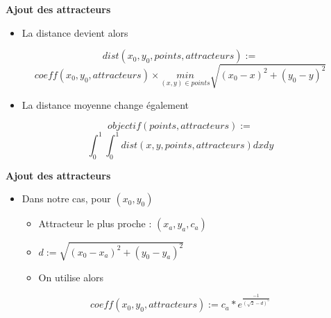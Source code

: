 \documentclass[10pt]{beamer}
\begin{document}
\begin{frame}{\textbf{Ajout des attracteurs}}

    \begin{itemize}
        \item La distance devient alors
    \end{itemize}
    $$dist(x_0, y_0, points, attracteurs) := $$
    $$coeff(x_0, y_0, attracteurs)\times\underset{(x, y)\in{}points}{min} \sqrt{(x_0-x)^2 + (y_0-y)^2}$$
    $$$$

    \begin{itemize}
        \item La distance moyenne change également
    \end{itemize}
    $$objectif(points, attracteurs) := $$
    $$\int_{0}^{1}\int_{0}^{1} dist(x, y, points, attracteurs) dxdy$$

\end{frame}


\begin{frame}{\textbf{Ajout des attracteurs}}
    
    \begin{itemize}
        \item Dans notre cas, pour $(x_0, y_0)$
        \begin{itemize}
            \item Attracteur le plus proche : $(x_a, y_a, c_a)$
            \item $d := \sqrt{(x_0-x_a)^2 + (y_0-y_a)^2}$
            \item On utilise alors
        \end{itemize}
    \end{itemize}
    $$coeff(x_0, y_0, attracteurs) := c_a*e^{\frac{-1}{(\sqrt{2}-d)^5}}$$

\end{frame}
\end{document}
